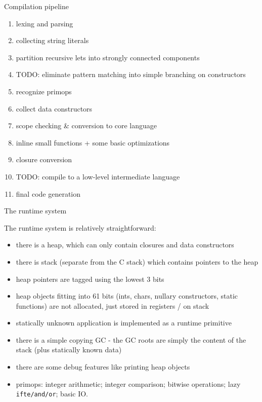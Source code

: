 \documentclass{beamer}
\begin{document}

\begin{frame}{Compilation pipeline}

\begin{enumerate}
\item lexing and parsing
\item collecting string literals
\item partition recursive lets into strongly connected components
\item TODO: eliminate pattern matching into simple branching on constructors
\item recognize primops
\item collect data constructors
\item scope checking \& conversion to core language
\item inline small functions + some basic optimizations
\item closure conversion
\item TODO: compile to a low-level intermediate language
\item final code generation 
\end{enumerate}

\end{frame}


\begin{frame}{The runtime system}

The runtime system is relatively straightforward:

{\small
\begin{itemize}
\item there is a heap, which can only contain closures and data constructors
\item there is stack (separate from the C stack) which contains pointers to the heap
\item heap pointers are tagged using the lowest 3 bits
\item heap objects fitting into 61 bits (ints, chars, nullary constructors, static functions) are
      not allocated, just stored in registers / on stack
\item statically unknown application is implemented as a runtime primitive 
\item there is a simple copying GC - the GC roots are simply the content of the stack
      (plus statically known data)
\item there are some debug features like printing heap objects
\item primops: integer arithmetic; integer comparison; bitwise operations; lazy {\tt ifte/and/or}; basic IO.
\end{itemize}
}

\end{frame}
\end{document}
